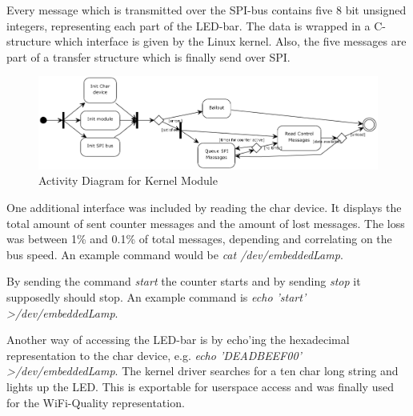 Every message which is transmitted over the SPI-bus contains five 8 bit unsigned integers, representing each part of the LED-bar. The 
data is wrapped in a C-structure which interface is given by the Linux kernel. Also, the five messages are part of a transfer structure which 
is finally send over SPI.

\begin{figure}[h]
   \centering
   \includegraphics[width=\textwidth]{img/kernel_activity.png}%
   \caption{Activity Diagram for Kernel Module}
   \label{fig:actKernel}%
\end{figure}

One additional interface was included by reading the char device. It displays the total amount of sent counter messages and the amount of 
lost messages. The loss was between 1\% and 0.1\% of total messages, depending and correlating on the bus speed.
An example command would be \textsl{cat /dev/embeddedLamp}.

By sending the command \textsl{start} the counter starts and by sending \textsl{stop} it supposedly should stop. An example command is \textsl{echo 'start' >/dev/embeddedLamp}.

Another way of accessing the LED-bar is by echo'ing the hexadecimal representation to the char device, e.g. \textsl{echo 'DEADBEEF00' >/dev/embeddedLamp}. The kernel driver searches for a ten char long string and lights up the LED. This is exportable for userspace access and was finally used for the WiFi-Quality representation.
